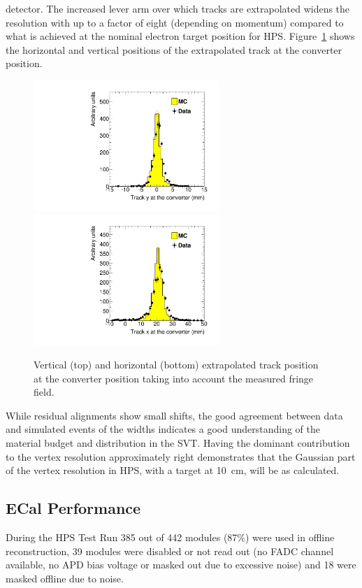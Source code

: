 \documentclass[final,3p,times,twocolumn]{elsarticle}
\begin{document}
detector. The increased 
lever arm over which tracks are extrapolated widens the resolution with up to a factor of eight 
(depending on momentum) compared to what is achieved at the nominal electron target position for 
HPS. Figure~\ref{fig:impact_param} shows the horizontal and vertical positions of the extrapolated track 
at the converter position. 
\begin{figure}[]
\begin{center}
	\includegraphics[width=7cm]{h_trk_top_fr_conv_z_h_trk_top_conv_z_dataMC_twotrksel-mod}
	\includegraphics[width=7cm]{h_trk_top_fr_conv_y_h_trk_top_conv_y_dataMC_twotrksel-mod}
	\caption{\small Vertical (top) and horizontal (bottom) extrapolated track position at the converter position 
	taking into account the measured fringe field. 	
	\label{fig:impact_param}}
\end{center}
\end{figure}
While residual alignments show small shifts, the good agreement  between data and simulated 
events of the widths indicates a good understanding of the material budget and distribution in the SVT.  
Having the dominant contribution to the vertex resolution approximately right demonstrates that the 
Gaussian part of the vertex resolution in HPS, with a target at 10~cm, will be as calculated.



\subsection{ECal Performance}
\label{sec:ecal_calibration}
During the HPS Test Run 385 out of 442 modules (87\%) were used in offline reconstruction, 39 modules 
were disabled or not read out (no FADC channel available, no APD bias voltage or masked out due to 
excessive noise) and 18 were masked offline due to noise. 
\end{document}
